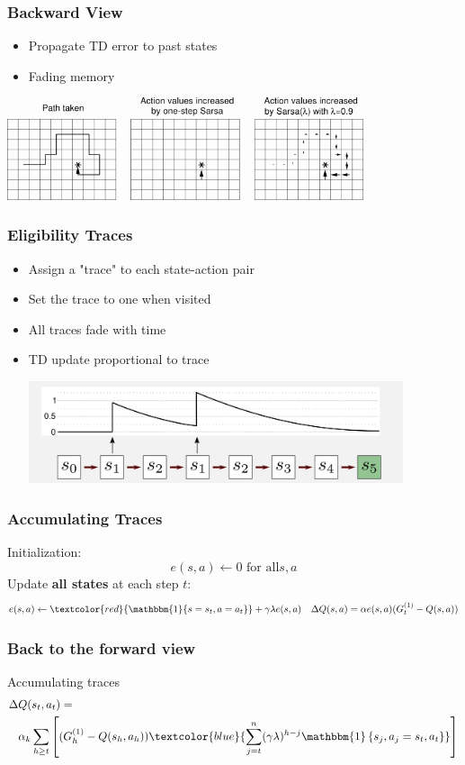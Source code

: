 \documentclass{beamer}
\begin{document}
\begin{frame}
\frametitle{Backward View}
\begin{itemize}
\item Propagate TD error to past states
\item Fading memory
\end{itemize}

\vfill
\centering
\bigskip\bigskip
\centerline{\includegraphics[height=3cm]{images/lambda}}

\end{frame}
\begin{frame}
\frametitle{Eligibility Traces}
\begin{itemize}
\item Assign a "trace" to each state-action pair
\item Set the trace to one when visited
\item All traces fade with time
\item TD update proportional to trace

\vfill
\centering
\bigskip\bigskip
\centerline{\includegraphics[height=3cm]{images/trace}}
\end{itemize}
\end{frame}

\begin{frame}
\frametitle{Accumulating Traces}
Initialization:
\[
	e(s,a) \gets 0 \text{ for all} s,a
\]
Update \textbf{all states} at each step $t$:
\begin{align*}
&
e(s,a) \gets 
\textcolor{red}{\mathbbm{1}\{s=s_t,a=a_t\}}+ 
\gamma\lambda e(s,a)
& \Delta Q(s,a) = \alpha e(s,a)(G_t^{(1)} - Q(s,a))
\end{align*}
\end{frame}

\begin{frame}
\frametitle{Back to the forward view}
Accumulating traces
\begin{align*}
	\Delta & Q(s_t,a_t) = \\ 
	&\alpha_k
	\sum_{h\geq t}\left[
	(G_h^{(1)} - Q(s_h,a_h))
	\textcolor{blue}{
	\sum_{j=t}^n(\gamma\lambda)^{h-j}
	\mathbbm{1}\left\{s_j,a_j = s_t,a_t\right\}}
	\right]
\end{align*}
\end{frame}
\end{document}
